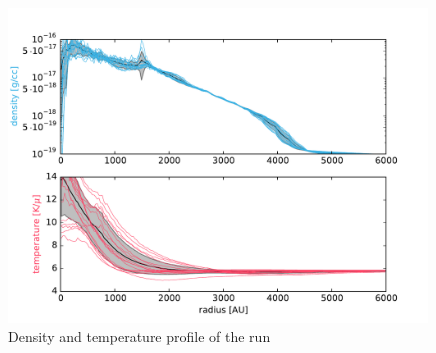 \begin{figure}[!htb]
 \centering
 \includegraphics[width=0.99\textwidth]{Figures/var_rt_profiles/timeave_n1c10_6000AU_80_85kyrs}
 \captionsetup{justification=justified,singlelinecheck=false,width=\linewidth}
 \decoRule
 \caption[ profiles]{Density and temperature profile of the  run}
\label{fig:n1c10.0_profile}
\end{figure}
\FloatBarrier



